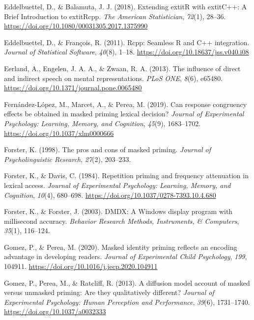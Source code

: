 \documentclass[
  english,
  man,floatsintext]{apa6}
\newlength{\cslhangindent}
\newlength{\cslentryspacingunit} %
\newenvironment{CSLReferences}[2] %
 {%
  \setlength{\parindent}{0pt}
  \ifodd #1
  \let\oldpar\par
  \def\par{\hangindent=\cslhangindent\oldpar}
  \fi
  \setlength{\parskip}{#2\cslentryspacingunit}
 }%
 {}
\begin{document}
\begin{CSLReferences}{1}{0}
\leavevmode{}%
Eddelbuettel, D., \& Balamuta, J. J. (2018). {Extending extit{R} with extit{C++}: A Brief Introduction to extit{Rcpp}}. \emph{The American Statistician}, \emph{72}(1), 28--36. \url{https://doi.org/10.1080/00031305.2017.1375990}

\leavevmode{}%
Eddelbuettel, D., \& François, R. (2011). {Rcpp}: Seamless {R} and {C++} integration. \emph{Journal of Statistical Software}, \emph{40}(8), 1--18. \url{https://doi.org/10.18637/jss.v040.i08}

\leavevmode{}%
Eerland, A., Engelen, J. A. A., \& Zwaan, R. A. (2013). The influence of direct and indirect speech on mental representations. \emph{{PLoS} {ONE}}, \emph{8}(6), e65480. \url{https://doi.org/10.1371/journal.pone.0065480}

\leavevmode{}%
Fernández-López, M., Marcet, A., \& Perea, M. (2019). Can response congruency effects be obtained in masked priming lexical decision? \emph{Journal of Experimental Psychology: Learning, Memory, and Cognition}, \emph{45}(9), 1683--1702. \url{https://doi.org/10.1037/xlm0000666}

\leavevmode{}%
Forster, K. (1998). The pros and cons of masked priming. \emph{Journal of Psycholinguistic Research}, \emph{27}(2), 203--233.

\leavevmode{}%
Forster, K., \& Davis, C. (1984). Repetition priming and frequency attenuation in lexical access. \emph{Journal of Experimental Psychology: Learning, Memory, and Cognition}, \emph{10}(4), 680--698. \url{https://doi.org/10.1037/0278-7393.10.4.680}

\leavevmode{}%
Forster, K., \& Forster, J. (2003). {DMDX}: {A Windows} display program with millisecond accuracy. \emph{Behavior Research Methods, Instruments, \& Computers}, \emph{35}(1), 116--124.

\leavevmode{}%
Gomez, P., \& Perea, M. (2020). Masked identity priming reflects an encoding advantage in developing readers. \emph{Journal of Experimental Child Psychology}, \emph{199}, 104911. \url{https://doi.org/10.1016/j.jecp.2020.104911}

\leavevmode{}%
Gomez, P., Perea, M., \& Ratcliff, R. (2013). A diffusion model account of masked versus unmasked priming: {Are} they qualitatively different? \emph{Journal of Experimental Psychology: Human Perception and Performance}, \emph{39}(6), 1731--1740. \url{https://doi.org/10.1037/a0032333}


\end{CSLReferences}
\end{document}
